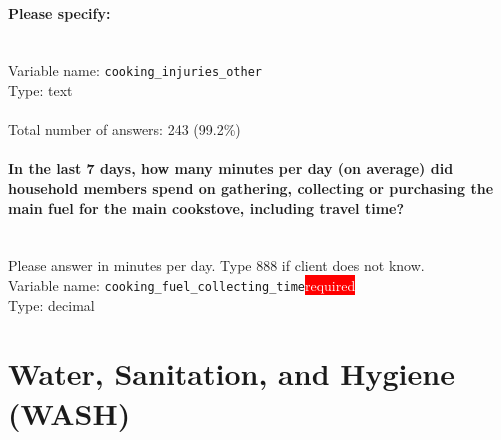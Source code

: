 \documentclass[11.5pt, a4paper]{scrartcl}
\begin{document}
\paragraph{Please specify:}
\  \\Variable name: \texttt{cooking\_injuries\_other}\\
Type: text\\
\\Total number of answers: 243 (99.2\%)
\\[0.2em]\paragraph{In the last 7 days, how many minutes per day (on average) did household members spend on gathering, collecting or purchasing the main fuel for the main cookstove, including travel time? }
\ \\ {\small Please answer in minutes per day. Type 888 if client does not know. }
\  \\Variable name: \texttt{cooking\_fuel\_collecting\_time}\hfill\colorbox{red}{\small{\textcolor{white}{required}}}\\
 Type: decimal\\
\newpage\section{Water, Sanitation, and Hygiene (WASH)}
\end{document}
